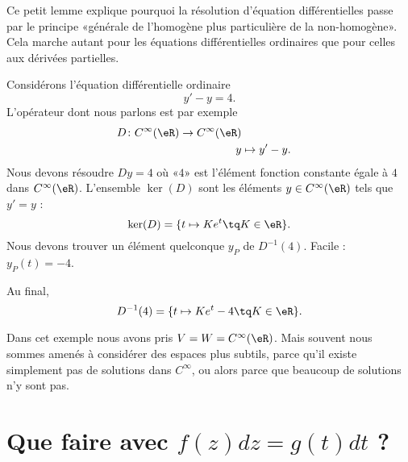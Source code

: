 Ce petit lemme explique pourquoi la résolution d'équation différentielles passe par le principe «générale de l'homogène plus particulière de la non-homogène». Cela marche autant pour les équations différentielles ordinaires que pour celles aux dérivées partielles.

\begin{example}
	Considérons l'équation différentielle ordinaire
	\begin{equation}
		y'-y=4.
	\end{equation}
	L'opérateur dont nous parlons est par exemple
	\begin{equation}
		\begin{aligned}
			D\colon  C^{\infty}(\eR)\to  C^{\infty}(\eR) \\
			y & \mapsto y'-y .
		\end{aligned}
	\end{equation}
	Nous devons résoudre \( Dy=4\) où «\( 4\)»  est l'élément fonction constante égale à \( 4\) dans \(  C^{\infty}(\eR)\). L'ensemble \( \ker(D)\) sont les éléments \( y\in C^{\infty}(\eR)\) tels que \( y'=y\) :
	\begin{equation}
		\ker(D)=\{ t\mapsto K e^{t}\tq K\in \eR \}.
	\end{equation}
	Nous devons trouver un élément quelconque \( y_P\) de \( D^{-1}(4)\). Facile : \( y_P(t)=-4\).

	Au final,
	\begin{equation}
		D^{-1}(4)=\{ t\mapsto K e^{t}-4\tq K\in \eR \}.
	\end{equation}
\end{example}

Dans cet exemple nous avons pris \( V=W= C^{\infty}(\eR)\). Mais souvent nous sommes amenés à considérer des espaces plus subtils, parce qu'il existe simplement pas de solutions dans \(  C^{\infty}\), ou alors parce que beaucoup de solutions n'y sont pas.

\section{Que faire avec \texorpdfstring{\( f(z)dz=g(t)dt\)}{fzdz} ?}
\label{SecFairedzdt}

